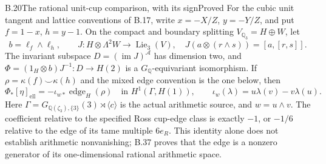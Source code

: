 \begin{statement}{B.20}{The rational unit-cup comparison, with its sign}{Proved}
For the cubic unit tangent and lattice conventions of B.17,
write $x=-X/Z$, $y=-Y/Z$, and put
$f=1-x$, $h=y-1$. On the compact and boundary splitting
$V_{\mathbb Q_3}=H\oplus W$, let
\[
 b=\ell_f\wedge\ell_h,\qquad
 J:H\otimes\Lambda^2W\longrightarrow\operatorname{Lie}_3(V),
       \quad J(a\otimes(r\wedge s))=[a,[r,s]].
\]
The invariant subspace $D=(\operatorname{im}J)^{\mathcal A}$
has dimension two, and
$\Phi=(1_H\otimes b)J^{-1}:D\to H(2)$ is a
$G_{\mathbb Q}$-equivariant isomorphism. If
$\rho=\kappa(f)\smile\kappa(h)$ and the mixed edge convention
is the one below, then
\[
       \Phi_*[\eta]_{\mathrm{ell}}
       =-\iota_{w*}\operatorname{edge}_H(\rho)
                          \quad\text{in }H^1(\Gamma,H(1)),
 \qquad
       \iota_w(\lambda)=u\lambda(v)-v\lambda(u).                 \tag{B.20.1}
\]
Here $\Gamma=G_{\mathbb Q(\zeta_3),\{3\}}(3)\rtimes
\langle c\rangle$ is the actual arithmetic source, and
$w=u\wedge v$. The coefficient relative to the specified
Ross cup-edge class is exactly $-1$, or $-1/6$ relative to
the edge of its tame multiple $6e_R$. This identity alone
does not establish arithmetic nonvanishing; B.37 proves
that the edge is a nonzero generator of its one-dimensional
rational arithmetic space.
\end{statement}
